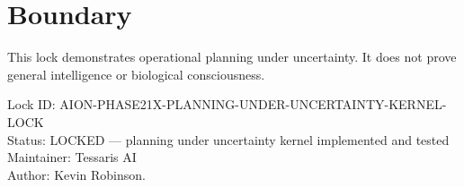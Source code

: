 \documentclass[11pt,a4paper]{article}
\begin{document}
\section{Boundary}

This lock demonstrates operational planning under uncertainty. It does not prove general intelligence or biological consciousness.

\bigskip

\noindent
Lock ID: AION-PHASE21X-PLANNING-UNDER-UNCERTAINTY-KERNEL-LOCK\\
Status: LOCKED --- planning under uncertainty kernel implemented and tested\\
Maintainer: Tessaris AI\\
Author: Kevin Robinson.
\end{document}

